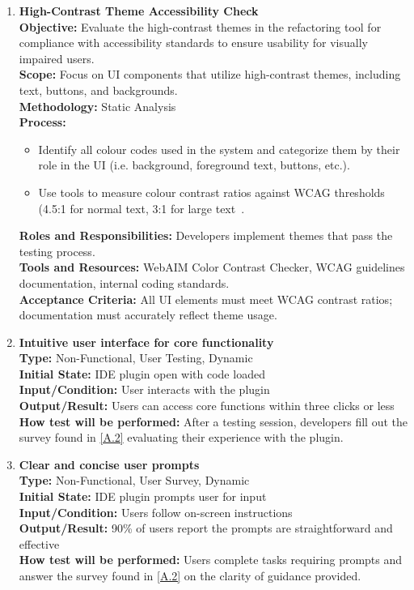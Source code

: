 \documentclass[12pt, titlepage]{article}
\begin{document}
\begin{enumerate}[label={\bf \textcolor{Maroon}{test-UH-\arabic*}}, wide=0pt, font=\itshape]
  \item \textbf{High-Contrast Theme Accessibility Check} \\[2mm]
    \textbf{Objective:} Evaluate the high-contrast themes in the refactoring tool for compliance with accessibility standards to ensure usability for visually impaired users. \\
    \textbf{Scope:} Focus on UI components that utilize high-contrast themes, including text, buttons, and backgrounds. \\
    \textbf{Methodology:} Static Analysis \\
    \textbf{Process:} 
    \begin{itemize}
      \item Identify all colour codes used in the system and categorize them by their role in the UI (i.e. background, foreground text, buttons, etc.).
      \item Use tools to measure colour contrast ratios against WCAG thresholds (4.5:1 for normal text, 3:1 for large text~\cite{WCAG}.
    \end{itemize}
    \textbf{Roles and Responsibilities:} Developers implement themes that pass the testing process. \\[2mm]
    \textbf{Tools and Resources:} WebAIM Color Contrast Checker, WCAG guidelines documentation, internal coding standards. \\[2mm]
    \textbf{Acceptance Criteria:} All UI elements must meet WCAG contrast ratios; documentation must accurately reflect theme usage.

  \item \textbf{Intuitive user interface for core functionality} \\[2mm]
    \textbf{Type:} Non-Functional, User Testing, Dynamic \\
    \textbf{Initial State:} IDE plugin open with code loaded \\
    \textbf{Input/Condition:} User interacts with the plugin \\
    \textbf{Output/Result:} Users can access core functions within three clicks or less \\[2mm]
    \textbf{How test will be performed:} After a testing session, developers fill out the survey found in \ref{A.2} evaluating their experience with the plugin.

  \item \textbf{Clear and concise user prompts} \\[2mm]
    \textbf{Type:} Non-Functional, User Survey, Dynamic \\
    \textbf{Initial State:} IDE plugin prompts user for input \\
    \textbf{Input/Condition:} Users follow on-screen instructions \\
    \textbf{Output/Result:} 90\% of users report the prompts are straightforward and effective \\[2mm]
    \textbf{How test will be performed:} Users complete tasks requiring prompts and answer the survey found in \ref{A.2} on the clarity of guidance provided.


\end{enumerate}
\end{document}
